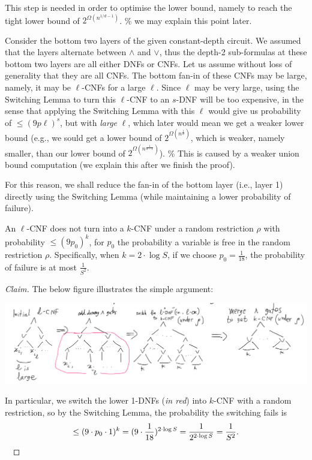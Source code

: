 



This step is needed in order to optimise the lower bound, namely to reach the tight lower bound of $2^{\Omega(n^{1/d-1})}$. \% we may explain this point later.

Consider the bottom two layers of the given constant-depth circuit. We assumed that the layers alternate between $\land$ and $\lor$, thus the depth-2 sub-formulas  at these bottom two layers are all either DNFs or CNFs. Let us assume  without loss of generality  that they are all CNFs. The bottom fan-in of these CNFs may be large, namely, it may be $\ell$-CNFs for a large $\ell$. 
Since  $\ell$ may be  very large, using the Switching Lemma to turn this $\ell$-CNF to an $s$-DNF will be too expensive, in the sense that applying the Switching Lemma with this $\ell$ would give us probability of $\leq (9p\ell)^s$, but with \emph{large} $\ell$, which later would mean we get a weaker lower bound (e.g., we sould get a lower bound of $2^{\Omega(n^{\frac{1}{d}})}$, which is weaker, namely smaller, than our lower bound of $2^{\Omega(n^{\frac{1}{d-1}})}$).
\textcolor[rgb]{0.815686,0.815686,0.815686}{\% This is caused by a weaker union bound computation (we explain this after we finish the proof).}



For this reason, we shall reduce the fan-in of the bottom layer (i.e., layer 1) directly using the Switching Lemma (while maintaining a lower probability of failure).

\begin{claim}\label{cla:}
An $\ell$-CNF does not turn into a $k$-CNF under a random restriction $\rho$ with probability $\leq (9p_0)^k$, for $p_0$ the probability a variable is free in the random restriction $\rho$. Specifically, when $k = 2 \cdot \log S$, if we choose $p_0 = \frac{1}{18}$, the probability of failure is at most $ \frac{1}{S^2}$.
\end{claim}

\begin{proof}[Claim]
The below figure illustrates  the simple argument:

\begin{center}
\includegraphics[width=\textwidth]{images/bottom-layer-switch.png}
\end{center}


In particular, we switch the lower 1-DNFs (\emph{in red}) into $k$-CNF with a random restriction, so by the Switching Lemma, the probability the switching fails is 
\[
\leq (9 \cdot p_0 \cdot1)^k = (9 \cdot \frac{1}{18})^{2 \cdot \log S} = \frac{1}{2^{2 \cdot\log S}} = \frac{1}{S^2}.
\]
\
\end{proof}

